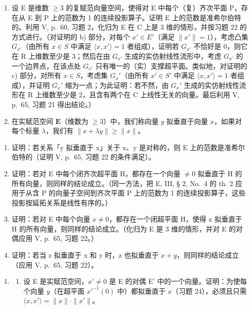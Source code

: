 \begin{enumerate}
\def\labelenumi{¶ \arabic{enumi})}
\setcounter{enumi}{22}
\item
  设 E 是维数 \(\geqslant 3\) 的复赋范向量空间，使得对 E 中每个（复）齐次平面 P，存在从 E 到 P 上的范数为 1 的连续投影算子。证明 E 上的范数是准希尔伯特的。利用 V, p.~60, 习题 2，化归为 E 在 C 上是 3 维的情形，并按习题 22 的方式进行。（对证明的 b) 部分，对每个 \(x' \in E'\)（满足 \(\|x'\| = 1\)），考虑凸集 \(G_{x'}\)（由所有 \(x \in S\) 中满足 \(\langle x, x' \rangle = 1\) 者组成），证明若 \(G_{x'}\) 不恰好是 0，则它在 R 上维数至少是 3；然后在由 \(G_{x'}\) 生成的实仿射线性流形中，考虑 \(G_{x'}\) 的一个边界点，在该点处 \(G_{x'}\) 只有唯一的（实）支撑超平面。类似地，对证明的 c) 部分，对所有 \(x \in S\)，考虑集 \(G_{x}'\)（由所有 \(x' \in S'\) 中满足 \(\langle x, x' \rangle = 1\) 者组成），并证明 \(G_{x}'\) 缩为一点；为此证明：若不然，由 \(G_{x}'\) 生成的实仿射线性流形在 R 上维数至少是 2，且含有两个在 C 上线性无关的向量。最后利用 V, p.~65, 习题 21 得出结论。）
\item
  在实赋范空间 \(\mathbf{E}\)（维数为 \(\geqslant 3\)）中，我们称向量 \(y\) 拟垂直于向量 \(x\)，如果对每个标量 \(\lambda\)，我们有 \(\| x + \lambda y \| \geqslant \| x \|\)。
\end{enumerate}

\begin{enumerate}
\def\labelenumi{\alph{enumi})}
\item
  证明：若关系「y 拟垂直于 x」关于 x、y 是对称的，则 E 上的范数是准希尔伯特的（证明 V, p.~65, 习题 22 的条件满足）。
\item
  证明：若对 E 中每个闭齐次超平面 H，都存在一个向量 \(\neq 0\) 拟垂直于 H 的所有向量，则同样的结论成立。（同一方法，把 E, III, § 2, No.~4 的 th. 2 应用于从含 P 的向量子空间到齐次平面 P 上的范数为 1 的连续投影算子，这些投影按延拓关系是线性有序的。）
\item
  证明：若对 E 中每个向量 \(x \neq 0\)，都存在一个闭超平面 H，使得 x 拟垂直于 H 的所有向量，则同样的结论成立。（化归为 E 是 3 维的情形，并对 E 的对偶应用 V, p.~65, 习题 22。）
\item
  证明：若当 z 拟垂直于 x 和 y 时，z 也拟垂直于 \(x + y\)，则同样的结论成立（应用 V, p.~65, 习题 22）。
\end{enumerate}

\begin{enumerate}
\def\labelenumi{\arabic{enumi})}
\setcounter{enumi}{24}
\tightlist
\item
  \begin{enumerate}
  \def\labelenumii{\alph{enumii})}
  \tightlist
  \item
    设 E 是实赋范空间，\(x' \neq 0\) 是 E 的对偶 E' 中的一个向量。证明：为使每个向量 \(y\)（在超平面 \(x'^{-1}(0)\) 中）都拟垂直于 \(x\)（习题 24），必须且只需 \(\langle x, x' \rangle = \| x \| \cdot \| x' \|\)。
  \end{enumerate}
\end{enumerate}

